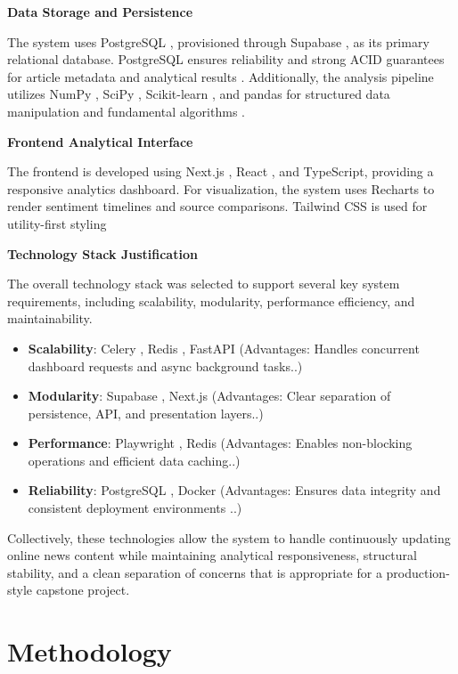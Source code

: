 \textbf{Data Storage and Persistence}

The system uses PostgreSQL \cite{ref06}, provisioned through Supabase \cite{ref19}, as its primary relational database. PostgreSQL ensures reliability and strong ACID guarantees for article metadata and analytical results \cite{ref06}. Additionally, the analysis pipeline utilizes NumPy \cite{ref07}, SciPy \cite{ref20}, Scikit-learn \cite{ref13}, and pandas \cite{ref36} for structured data manipulation and fundamental algorithms \cite{ref20,ref36}.

\textbf{Frontend Analytical Interface}

The frontend is developed using Next.js \cite{ref31}, React \cite{ref32}, and TypeScript, providing a responsive analytics dashboard. For visualization, the system uses Recharts \cite{ref34} to render sentiment timelines and source comparisons. Tailwind CSS \cite{ref33} is used for utility-first styling

\textbf{Technology Stack Justification}

The overall technology stack was selected to support several key system requirements, including scalability, modularity, performance efficiency, and maintainability.

\begin{itemize}
\item \textbf{Scalability}: Celery \cite{ref29}, Redis \cite{ref15}, FastAPI \cite{ref27} (Advantages: Handles concurrent dashboard requests and async background tasks..)
\item \textbf{Modularity}: Supabase \cite{ref19}, Next.js \cite{ref31} (Advantages: Clear separation of persistence, API, and presentation layers..)
\item \textbf{Performance}: Playwright \cite{ref30}, Redis \cite{ref15} (Advantages: Enables non-blocking operations and efficient data caching..)
\item \textbf{Reliability}: PostgreSQL \cite{ref06}, Docker \cite{ref35} (Advantages: Ensures data integrity and consistent deployment environments \cite{ref35}..)
\end{itemize}
Collectively, these technologies allow the system to handle continuously updating online news content while maintaining analytical responsiveness, structural stability, and a clean separation of concerns that is appropriate for a production-style capstone project.

\section{Methodology}

